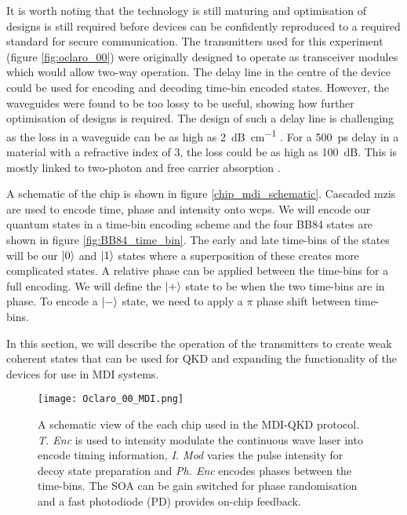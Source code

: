It is worth noting that the technology is still maturing and optimisation of designs is still required before devices can be confidently reproduced to a required standard for secure communication. The transmitters used for this experiment (figure \ref{fig:oclaro_00}) were originally designed to operate as transceiver modules which would allow two-way operation. The delay line in the centre of the device could be used for encoding and decoding time-bin encoded states. However, the waveguides were found to be too lossy to be useful, showing how further optimisation of designs is required. The design of such a delay line is challenging as the loss in a waveguide can be as high as \SI{2}{dB\per\cm} \cite{JeppixRoadmap}. For a \SI{500}{ps} delay in a material with a refractive index of 3, the loss could be as high as \SI{100}{dB}. This is mostly linked to two-photon and free carrier absorption \cite{Kumar2019}.

A schematic of the chip is shown in figure \ref{chip_mdi_schematic}. Cascaded \acp{mzi} are used to encode time, phase and intensity onto \acp{wcp}.  We will encode our quantum states in a time-bin encoding scheme and the four BB84 states are shown in figure \ref{fig:BB84_time_bin}. The early and late time-bins of the states will be our $\ket{0}$ and $\ket{1}$ states where a superposition of these creates more complicated states. A relative phase can be applied between the time-bins for a full encoding. We will define the $\ket{+}$ state to be when the two time-bins are in phase. To encode a $\ket{-}$ state, we need to apply a $\pi$ phase shift between time-bins. 

In this section, we will describe the operation of the transmitters to create weak coherent states that can be used for \acl{QKD} and expanding the functionality of the devices for use in \ac{MDI} systems.

\begin{figure}[tbp]
	\texttt{[image: Oclaro\_00\_MDI.png]}
	\caption[InP transmitter schematic]{A schematic view of the each chip used in the MDI-QKD protocol. \textit{T. Enc} is used to intensity modulate the continuous wave laser into encode timing information, \textit{I. Mod} varies the pulse intensity for decoy state preparation and \textit{Ph. Enc} encodes phases between the time-bins. The SOA can be gain switched for phase randomisation and a fast photodiode (PD) provides on-chip feedback.}
	\label{fig:chip_mdi_schematic}
\end{figure}

